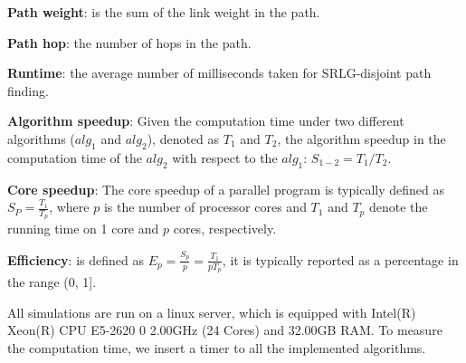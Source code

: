 %
%

\textbf{Path weight}: is the sum of the link weight in the path.


 \textbf{Path hop}: the number of hops in the path.

\textbf{Runtime}: the average number of milliseconds taken for SRLG-disjoint path finding.


\textbf{Algorithm speedup}: Given the computation time under two different  algorithms ($alg_1$ and $alg_2$), denoted as $T_1$ and $T_2$, the algorithm speedup in the computation time of the $alg_2$ with respect to the $alg_1$: ${S_{1 - 2}} = T_1/T_2$.


 \textbf{Core speedup}: The core speedup \cite{grama2003introduction} of a parallel program is typically defined as $S_P=\frac{T_1}{T_p}$,
where $p$ is the number of processor cores and $T_1$ and $T_p$ denote the running time on 1 core and $p$ cores, respectively.


 \textbf{Efficiency}: is defined \cite{grama2003introduction} as $E_p=\frac{S_p}{p}=\frac{T_1}{pT_p}$,
it is typically reported as a percentage in the range (0, 1].




All simulations are run on a linux server, which is equipped with Intel(R) Xeon(R) CPU E5-2620 0 \@ 2.00GHz (24 Cores) and 32.00GB RAM. To measure the computation time, we insert a timer to all the implemented algorithms.



